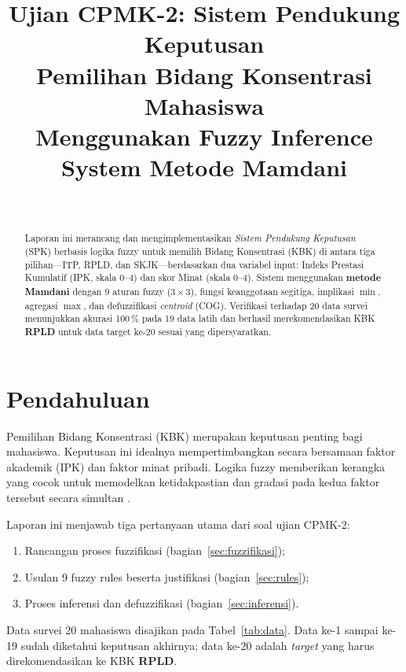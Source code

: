 \documentclass[conference]{IEEEtran}
\title{Ujian CPMK-2: Sistem Pendukung Keputusan\\Pemilihan Bidang Konsentrasi Mahasiswa\\Menggunakan Fuzzy Inference System Metode Mamdani}
\author{\IEEEauthorblockN{RIYADI}\\
\IEEEauthorblockA{NIM: H2A025002\\
Magister Teknik Elektro\\
Universitas Jenderal Soedirman\\
2026}}
\begin{document}
\maketitle

\begin{abstract}
Laporan ini merancang dan mengimplementasikan \emph{Sistem Pendukung
Keputusan} (SPK) berbasis logika fuzzy untuk memilih Bidang Konsentrasi
(KBK) di antara tiga pilihan---ITP, RPLD, dan SKJK---berdasarkan dua
variabel input: Indeks Prestasi Kumulatif (IPK, skala 0--4) dan skor
Minat (skala 0--4). Sistem menggunakan \textbf{metode Mamdani} dengan
9 aturan fuzzy ($3\times3$), fungsi keanggotaan segitiga, implikasi
$\min$, agregasi $\max$, dan defuzzifikasi \emph{centroid} (COG).
Verifikasi terhadap 20 data survei menunjukkan akurasi 100\,\% pada
19 data latih dan berhasil merekomendasikan KBK \textbf{RPLD} untuk
data target ke-20 sesuai yang dipersyaratkan.
\end{abstract}

\section{Pendahuluan}
\label{sec:intro}

Pemilihan Bidang Konsentrasi (KBK) merupakan keputusan penting bagi
mahasiswa. Keputusan ini idealnya mempertimbangkan secara bersamaan
faktor akademik (IPK) dan faktor minat pribadi. Logika fuzzy memberikan
kerangka yang cocok untuk memodelkan ketidakpastian dan gradasi pada
kedua faktor tersebut secara simultan \cite{zadeh1965}.

Laporan ini menjawab tiga pertanyaan utama dari soal ujian CPMK-2:
\begin{enumerate}[nosep]
  \item Rancangan proses fuzzifikasi (bagian~\ref{sec:fuzzifikasi});
  \item Usulan 9 fuzzy rules beserta justifikasi (bagian~\ref{sec:rules});
  \item Proses inferensi dan defuzzifikasi (bagian~\ref{sec:inferensi}).
\end{enumerate}

Data survei 20 mahasiswa disajikan pada Tabel~\ref{tab:data}. Data
ke-1 sampai ke-19 sudah diketahui keputusan akhirnya; data ke-20
adalah \emph{target} yang harus direkomendasikan ke KBK \textbf{RPLD}.
\end{document}

